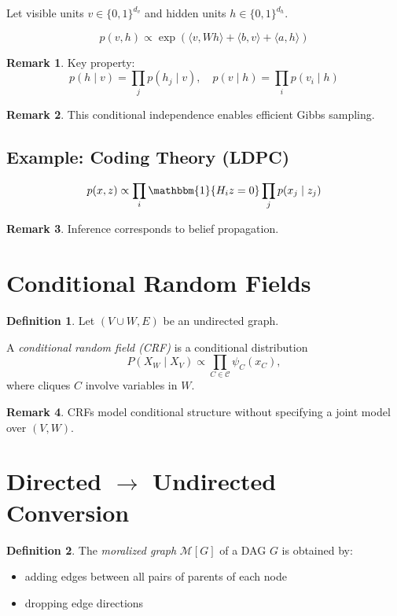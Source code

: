 \documentclass[12pt,oneside]{book}
\numberwithin{equation}{section}
\theoremstyle{definition}
\newtheorem{definition}{Definition}[section]
\newtheorem{remark}{Remark}[section]
\theoremstyle{plain}
\theoremstyle{remark}
\begin{document}
Let visible units $v \in \{0,1\}^{d_v}$ and hidden units $h \in \{0,1\}^{d_h}$.

\[
p(v,h) \propto \exp\left( \langle v,Wh\rangle + \langle b,v\rangle + \langle a,h\rangle \right)
\]

\begin{remark}
Key property:
\[
p(h \mid v) = \prod_j p(h_j \mid v),
\quad
p(v \mid h) = \prod_i p(v_i \mid h)
\]
\end{remark}

\begin{remark}
This conditional independence enables efficient Gibbs sampling.
\end{remark}


\subsection{Example: Coding Theory (LDPC)}

\[
p(x,z)
\propto
\prod_i \mathbbm{1}\{H_i z = 0\}
\prod_j p(x_j \mid z_j)
\]

\begin{remark}
Inference corresponds to belief propagation.
\end{remark}


\section{Conditional Random Fields}

\begin{definition}
Let $(V \cup W, E)$ be an undirected graph.

A \emph{conditional random field (CRF)} is a conditional distribution
\[
P(X_W \mid X_V)
\propto
\prod_{C \in \mathcal{C}} \psi_C(x_C),
\]
where cliques $C$ involve variables in $W$.
\end{definition}

\begin{remark}
CRFs model conditional structure without specifying a joint model over $(V,W)$.
\end{remark}


\section{Directed $\to$ Undirected Conversion}

\begin{definition}
The \emph{moralized graph} $\mathcal{M}[G]$ of a DAG $G$ is obtained by:
\begin{itemize}
\item adding edges between all pairs of parents of each node
\item dropping edge directions
\end{itemize}
\end{definition}
\end{document}
